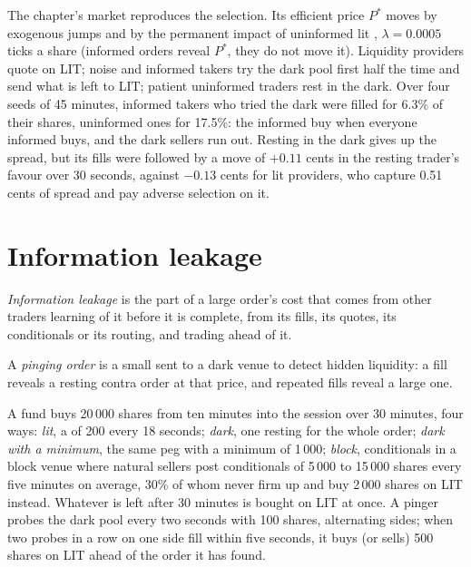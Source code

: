 The chapter's market reproduces the selection. Its efficient price $P^\ast$ moves by exogenous jumps and by the permanent impact of uninformed lit
, $\lambda=0.0005$ ticks a share (informed orders reveal $P^\ast$, they do not move it). Liquidity providers quote on LIT; noise and
informed takers try the dark pool first half the time and send what is left to LIT; patient uninformed traders rest  in the dark. Over four
seeds of 45 minutes, informed takers who tried the dark were filled for 6.3\% of their shares, uninformed ones for 17.5\%: the informed buy when
everyone informed buys, and the dark sellers run out. Resting in the dark gives up the spread, but its fills were followed by a move of $+0.11$ cents in the
resting trader's favour over 30 seconds, against $-0.13$ cents for lit providers, who capture 0.51 cents of spread and pay adverse selection on it.

\section{Information leakage}

\begin{definition}\label{def:mx:dark-pools-and-blocks:leakage}
\emph{Information leakage} is the part of a large order's cost that comes from other traders learning of it before it is
complete, from its fills, its quotes, its conditionals or its routing, and trading ahead of it.
\end{definition}

\begin{definition}\label{def:mx:dark-pools-and-blocks:ping}
A \emph{pinging order} is a small  sent to a dark venue to detect hidden liquidity: a fill reveals a
resting contra order at that price, and repeated fills reveal a large one.
\end{definition}

A fund buys 20\,000 shares from ten minutes into the session over 30 minutes, four ways: \emph{lit}, a  of 200 every 18 seconds;
\emph{dark}, one resting  for the whole order; \emph{dark with a minimum}, the same peg with a minimum of 1\,000; \emph{block}, conditionals
in a block venue where natural sellers post conditionals of 5\,000 to 15\,000 shares every five minutes on average, 30\% of whom never firm up and buy
2\,000 shares on LIT instead. Whatever is left after 30 minutes is bought on LIT at once. A pinger probes the dark pool every two seconds with 100 shares,
alternating sides; when two probes in a row on one side fill within five seconds, it buys (or sells) 500 shares on LIT ahead of the order it has found.

